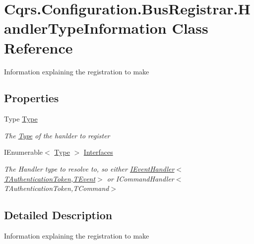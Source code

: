 \hypertarget{classCqrs_1_1Configuration_1_1BusRegistrar_1_1HandlerTypeInformation}{}\section{Cqrs.\+Configuration.\+Bus\+Registrar.\+Handler\+Type\+Information Class Reference}
\label{classCqrs_1_1Configuration_1_1BusRegistrar_1_1HandlerTypeInformation}


Information explaining the registration to make  


\subsection*{Properties}
\begin{DoxyCompactItemize}
\item 
Type \hyperlink{classCqrs_1_1Configuration_1_1BusRegistrar_1_1HandlerTypeInformation_a7b8982debc0f0c30197eeddafc9d558d_a7b8982debc0f0c30197eeddafc9d558d}{Type}
\begin{DoxyCompactList}\small\item\em The \hyperlink{classCqrs_1_1Configuration_1_1BusRegistrar_1_1HandlerTypeInformation_a7b8982debc0f0c30197eeddafc9d558d_a7b8982debc0f0c30197eeddafc9d558d}{Type} of the hanlder to register \end{DoxyCompactList}\item 
I\+Enumerable$<$ \hyperlink{classCqrs_1_1Configuration_1_1BusRegistrar_1_1HandlerTypeInformation_a7b8982debc0f0c30197eeddafc9d558d_a7b8982debc0f0c30197eeddafc9d558d}{Type} $>$ \hyperlink{classCqrs_1_1Configuration_1_1BusRegistrar_1_1HandlerTypeInformation_ac8a718951409cb2441c6184ab8257387_ac8a718951409cb2441c6184ab8257387}{Interfaces}
\begin{DoxyCompactList}\small\item\em The Handler type to resolve to, so either \hyperlink{interfaceCqrs_1_1Events_1_1IEventHandler}{I\+Event\+Handler$<$\+T\+Authentication\+Token,\+T\+Event$>$} or I\+Command\+Handler$<$\+T\+Authentication\+Token,\+T\+Command$>$ \end{DoxyCompactList}\end{DoxyCompactItemize}


\subsection{Detailed Description}
Information explaining the registration to make 



